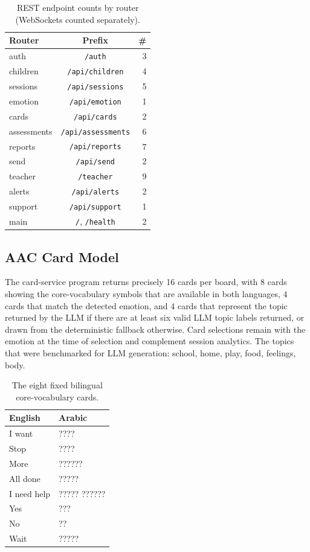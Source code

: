 \documentclass[conference]{IEEEtran}
\newcommand{\ar}[1]{#1}
\begin{document}
\begin{table}[!t]
\caption{REST endpoint counts by router (WebSockets counted separately).}
\label{tab:II}
\centering
\small
\begin{tabular}{@{}lcr@{}}
\toprule
\textbf{Router} & \textbf{Prefix} & \textbf{\#} \\
\midrule
auth & \texttt{/auth} & 3 \\
children & \texttt{/api/children} & 4 \\
sessions & \texttt{/api/sessions} & 5 \\
emotion & \texttt{/api/emotion} & 1 \\
cards & \texttt{/api/cards} & 2 \\
assessments & \texttt{/api/assessments} & 6 \\
reports & \texttt{/api/reports} & 7 \\
send & \texttt{/api/send} & 2 \\
teacher & \texttt{/teacher} & 9 \\
alerts & \texttt{/api/alerts} & 2 \\
support & \texttt{/api/support} & 1 \\
main & \texttt{/}, \texttt{/health} & 2 \\
\bottomrule
\end{tabular}
\end{table}

\subsection{AAC Card Model}
The card-service program returns precisely 16 cards per board, with 8 cards showing the core-vocabulary symbols that are available in both languages, 4 cards that match the detected emotion, and 4 cards that represent the topic returned by the LLM if there are at least six valid LLM topic labels returned, or drawn from the deterministic fallback otherwise. Card selections remain with the emotion at the time of selection and complement session analytics. The topics that were benchmarked for LLM generation: school, home, play, food, feelings, body.

\begin{table}[!t]
\caption{The eight fixed bilingual core-vocabulary cards.}
\label{tab:III}
\centering
\small
\begin{tabular}{@{}ll@{}}
\toprule
\textbf{English} & \textbf{Arabic} \\
\midrule
I want & \ar{????} \\
Stop & \ar{????} \\
More & \ar{??????} \\
All done & \ar{?????} \\
I need help & \ar{????? ??????} \\
Yes & \ar{???} \\
No & \ar{??} \\
Wait & \ar{?????} \\
\bottomrule
\end{tabular}
\end{table}
\end{document}
